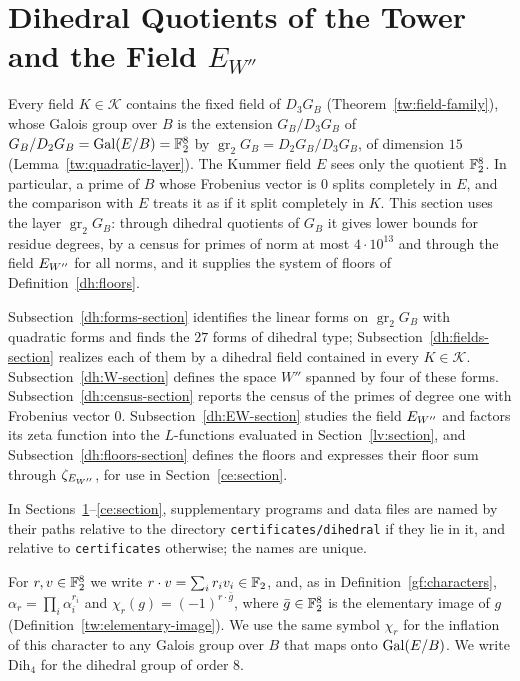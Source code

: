\section{\texorpdfstring{Dihedral Quotients of the Tower and the Field $E_{W''}$}{Dihedral Quotients of the Tower and the Field E\_W''}}
\label{dh:section}

Every field $K\in\mathcal K$ contains the fixed field of $D_3G_B$
(Theorem~\ref{tw:field-family}), whose Galois group over $B$ is the extension
$G_B/D_3G_B$ of $G_B/D_2G_B=\operatorname{Gal}(E/B)=\mathbb F_2^8$ by
$\operatorname{gr}_2G_B=D_2G_B/D_3G_B$, of dimension $15$
(Lemma~\ref{tw:quadratic-layer}). The Kummer field $E$ sees only the quotient
$\mathbb F_2^8$. In particular, a prime of $B$ whose Frobenius vector is $0$ splits
completely in $E$, and the comparison with $E$ treats it as if it split
completely in $K$. This section uses the layer $\operatorname{gr}_2G_B$:
through dihedral quotients of $G_B$ it gives lower bounds for residue
degrees, by a census for primes of norm at most $4\cdot10^{13}$ and through
the field $E_{W''}$ for all norms, and it supplies the system of floors of
Definition~\ref{dh:floors}.

Subsection~\ref{dh:forms-section} identifies the linear forms on
$\operatorname{gr}_2G_B$ with quadratic forms and finds the $27$ forms of
dihedral type; Subsection~\ref{dh:fields-section} realizes each of them by a
dihedral field contained in every $K\in\mathcal K$.
Subsection~\ref{dh:W-section} defines the space $W''$ spanned by four of
these forms. Subsection~\ref{dh:census-section} reports the census of the
primes of degree one with Frobenius vector $0$.
Subsection~\ref{dh:EW-section} studies the field $E_{W''}$ and factors its zeta
function into the $L$-functions evaluated in Section~\ref{lv:section}, and
Subsection~\ref{dh:floors-section} defines the floors and expresses their
floor sum through $\zeta_{E_{W''}}$, for use in Section~\ref{ce:section}.

In Sections~\ref{dh:section}--\ref{ce:section}, supplementary programs and
data files are named by their paths relative to the directory
\texttt{certificates/dihedral} if they lie in it, and relative to
\texttt{certificates} otherwise; the names are unique.

For $r,v\in\mathbb F_2^8$ we write $r\cdot v=\sum_ir_iv_i\in\mathbb F_2$, and, as in
Definition~\ref{gf:characters}, $\alpha_r=\prod_i\alpha_i^{r_i}$ and
$\chi_r(g)=(-1)^{r\cdot\bar g}$, where $\bar g\in\mathbb F_2^8$ is the elementary
image of $g$ (Definition~\ref{tw:elementary-image}). We use the same symbol
$\chi_r$ for the inflation of this character to any Galois group over $B$
that maps onto $\operatorname{Gal}(E/B)$. We write $\mathrm{Dih}_4$ for the dihedral group
of order $8$.

